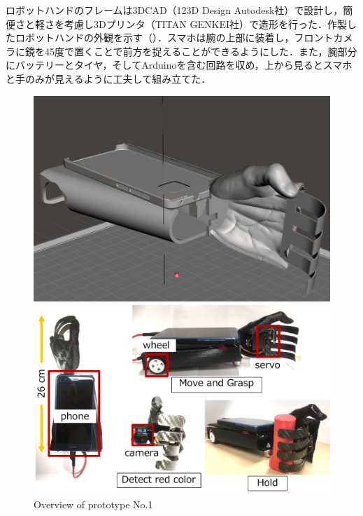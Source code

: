 ロボットハンドのフレームは3DCAD（123D Design Autodesk社）で設計し，簡便さと軽さを考慮し3Dプリンタ（TITAN GENKEI社）で造形を行った．作製したロボットハンドの外観を示す（）．スマホは腕の上部に装着し，フロントカメラに鏡を45度で置くことで前方を捉えることができるようにした．また，腕部分にバッテリーとタイヤ，そしてArduinoを含む回路を収め，上から見るとスマホと手のみが見えるように工夫して組み立てた．

\begin{figure}[H]
    \centering
    \begin{minipage}{\linewidth}
        \centering
        \includegraphics[width=0.7\linewidth]{figure/chapter3/robothand-v1_cad}
    \end{minipage}
    \begin{minipage}{\linewidth}
        \centering
        \includegraphics[width=\linewidth]{figure/chapter3/1号機外観}
    \end{minipage}
    \caption{Overview of prototype No.1}
    \label{fig:1号機外観}
\end{figure}

